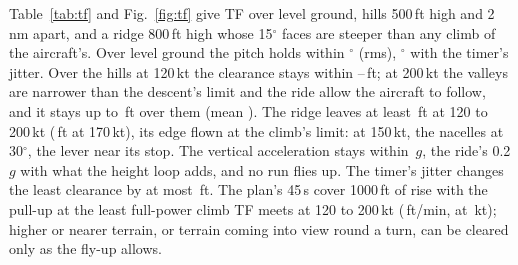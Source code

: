 \documentclass[10pt,a4paper,twocolumn]{article}
\begin{document}
Table~\ref{tab:tf} and Fig.~\ref{fig:tf} give TF over level ground, hills 500\,ft high and 2\,nm apart, and a ridge 800\,ft high whose 15$^\circ$
faces are steeper than any climb of the aircraft's. Over level ground the pitch holds within \NTfFlatRms$^\circ$ (rms), \NTfFlatJitRms$^\circ$
with the timer's jitter. Over the hills at 120\,kt the clearance stays within \NTfHillsSlowLo--\NTfHillsSlowHi\,ft; at 200\,kt the valleys are
narrower than the descent's limit and the ride allow the aircraft to follow, and it stays up to \NTfHillsFastHi\,ft over them (mean
\NTfHillsFastMean). The ridge leaves at least \NTfRidgeLo\,ft at 120 to 200\,kt (\NTfRidgeSeventy\,ft at 170\,kt), its edge flown at the climb's
limit: at 150\,kt, the nacelles at 30$^\circ$, the lever near its stop. The vertical acceleration
stays within \NTfG\,$g$, the ride's 0.2\,$g$ with what the height loop adds, and no run flies up. The timer's jitter changes the least clearance by at most \NTfJitter\,ft. The plan's 45\,s cover
1000\,ft of rise with the pull-up at the least full-power climb TF meets at 120 to 200\,kt (\NTfClimbLow\,ft/min, at \NTfClimbLowKt\,kt); higher or nearer
terrain, or terrain coming into view round a turn, can be cleared only as the fly-up allows.
\end{document}
